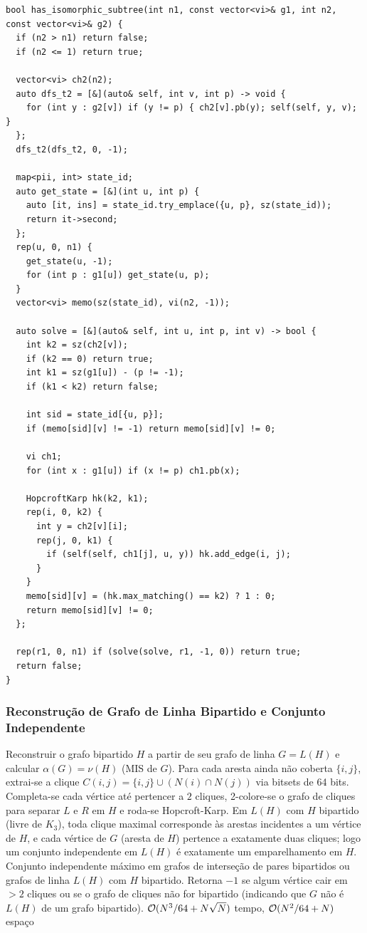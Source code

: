 \begin{lstlisting}
bool has_isomorphic_subtree(int n1, const vector<vi>& g1, int n2, const vector<vi>& g2) {
  if (n2 > n1) return false;
  if (n2 <= 1) return true;

  vector<vi> ch2(n2);
  auto dfs_t2 = [&](auto& self, int v, int p) -> void {
    for (int y : g2[v]) if (y != p) { ch2[v].pb(y); self(self, y, v); }
  };
  dfs_t2(dfs_t2, 0, -1);

  map<pii, int> state_id;
  auto get_state = [&](int u, int p) {
    auto [it, ins] = state_id.try_emplace({u, p}, sz(state_id));
    return it->second;
  };
  rep(u, 0, n1) {
    get_state(u, -1);
    for (int p : g1[u]) get_state(u, p);
  }
  vector<vi> memo(sz(state_id), vi(n2, -1));

  auto solve = [&](auto& self, int u, int p, int v) -> bool {
    int k2 = sz(ch2[v]);
    if (k2 == 0) return true;
    int k1 = sz(g1[u]) - (p != -1);
    if (k1 < k2) return false;

    int sid = state_id[{u, p}];
    if (memo[sid][v] != -1) return memo[sid][v] != 0;

    vi ch1;
    for (int x : g1[u]) if (x != p) ch1.pb(x);

    HopcroftKarp hk(k2, k1);
    rep(i, 0, k2) {
      int y = ch2[v][i];
      rep(j, 0, k1) {
        if (self(self, ch1[j], u, y)) hk.add_edge(i, j);
      }
    }
    memo[sid][v] = (hk.max_matching() == k2) ? 1 : 0;
    return memo[sid][v] != 0;
  };

  rep(r1, 0, n1) if (solve(solve, r1, -1, 0)) return true;
  return false;
}
\end{lstlisting}

\subsubsection{Reconstrução de Grafo de Linha Bipartido e Conjunto Independente}
\algobox
  {Reconstruir o grafo bipartido $H$ a partir de seu grafo de linha $G = L(H)$ e calcular $\alpha(G) = \nu(H)$ (MIS de $G$).}
  {Para cada aresta ainda não coberta $\{i, j\}$, extrai-se a clique $C(i, j) = \{i, j\} \cup (N(i) \cap N(j))$ via bitsets de 64 bits. Completa-se cada vértice até pertencer a $2$ cliques, 2-colore-se o grafo de cliques para separar $L$ e $R$ em $H$ e roda-se Hopcroft-Karp.}
  {Em $L(H)$ com $H$ bipartido (livre de $K_3$), toda clique maximal corresponde às arestas incidentes a um vértice de $H$, e cada vértice de $G$ (aresta de $H$) pertence a exatamente duas cliques; logo um conjunto independente em $L(H)$ é exatamente um emparelhamento em $H$.}
  {Conjunto independente máximo em grafos de interseção de pares bipartidos ou grafos de linha $L(H)$ com $H$ bipartido.}
  {Retorna $-1$ se algum vértice cair em $> 2$ cliques ou se o grafo de cliques não for bipartido (indicando que $G$ não é $L(H)$ de um grafo bipartido).}
  {$\mathcal{O}(N^3 / 64 + N\sqrt{N})$ tempo, $\mathcal{O}(N^2 / 64 + N)$ espaço}

